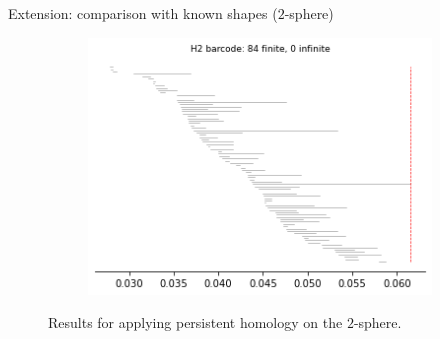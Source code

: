\documentclass[xcolor={dvipsnames,svgnames}]{beamer}
\begin{document}
\begin{frame}{Extension: comparison with known shapes ($2$-sphere)}
\begin{figure}[H]
\begin{subfigure}[b]{0.2\textwidth}
\includegraphics[width=\textwidth]{figures/dsphere_H2_barcode.png}
 \caption{}
\end{subfigure}
\caption{\scriptsize Results for applying persistent homology on the $2$-sphere.}
\end{figure}
\end{frame}
\end{document}
